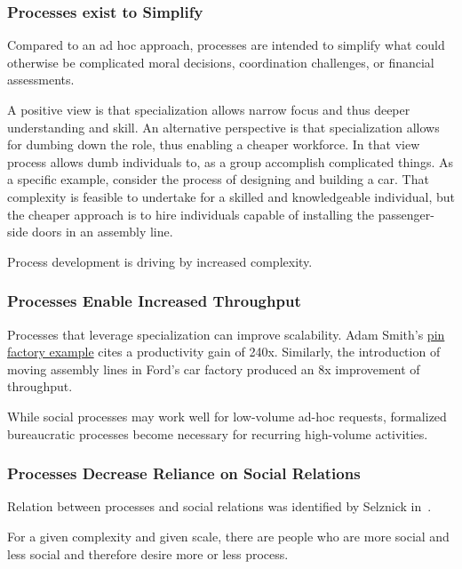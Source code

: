 \subsubsection{Processes exist to Simplify}
Compared to an ad hoc approach, processes are intended to simplify what could otherwise be complicated moral decisions, coordination challenges, or financial assessments. %



A positive view is that specialization allows narrow focus and thus deeper understanding and skill. An alternative perspective is that specialization allows for dumbing down the role, thus enabling a cheaper workforce. In that view process allows dumb individuals to, as a group accomplish complicated things.  As a specific example, consider the process of designing and building a car. That complexity is feasible to undertake for a skilled and knowledgeable individual, but the cheaper approach is to hire individuals capable of installing the passenger-side doors in an assembly line.

Process development is driving by increased complexity.

\subsubsection{Processes Enable Increased Throughput}

Processes that leverage specialization can improve scalability. Adam Smith's \href{https://en.wikipedia.org/wiki/Business_process#Adam_Smith}{pin factory example} cites a productivity gain of 240x. Similarly, the introduction of moving assembly lines in Ford's car factory produced an 8x improvement of throughput. 

While social processes may work well for low-volume ad-hoc requests, formalized bureaucratic processes become necessary for recurring high-volume activities.

\subsubsection{Processes Decrease Reliance on Social Relations}

Relation between processes and social relations was identified by Selznick in~\cite{1943_Selznick}.

For a given complexity and given scale, there are people who are more social and less social and therefore desire more or less process.

